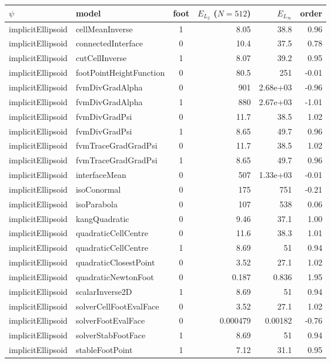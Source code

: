 \begin{tabular}{l l c r r r}
\hline
$\psi$ & model & foot & $E_{L_2}$ ($N{=}512$) & $E_{L_\infty}$ & order \\
\hline
implicitEllipsoid & cellMeanInverse & 1 & 8.05 & 38.8 & 0.96 \\
implicitEllipsoid & connectedInterface & 0 & 10.4 & 37.5 & 0.78 \\
implicitEllipsoid & cutCellInverse & 1 & 8.07 & 39.2 & 0.95 \\
implicitEllipsoid & footPointHeightFunction & 0 & 80.5 & 251 & -0.01 \\
implicitEllipsoid & fvmDivGradAlpha & 0 & 901 & 2.68e+03 & -0.96 \\
implicitEllipsoid & fvmDivGradAlpha & 1 & 880 & 2.67e+03 & -1.01 \\
implicitEllipsoid & fvmDivGradPsi & 0 & 11.7 & 38.5 & 1.02 \\
implicitEllipsoid & fvmDivGradPsi & 1 & 8.65 & 49.7 & 0.96 \\
implicitEllipsoid & fvmTraceGradGradPsi & 0 & 11.7 & 38.5 & 1.02 \\
implicitEllipsoid & fvmTraceGradGradPsi & 1 & 8.65 & 49.7 & 0.96 \\
implicitEllipsoid & interfaceMean & 0 & 507 & 1.33e+03 & -0.01 \\
implicitEllipsoid & isoConormal & 0 & 175 & 751 & -0.21 \\
implicitEllipsoid & isoParabola & 0 & 107 & 538 & 0.06 \\
implicitEllipsoid & kangQuadratic & 0 & 9.46 & 37.1 & 1.00 \\
implicitEllipsoid & quadraticCellCentre & 0 & 11.6 & 38.3 & 1.01 \\
implicitEllipsoid & quadraticCellCentre & 1 & 8.69 & 51 & 0.94 \\
implicitEllipsoid & quadraticClosestPoint & 0 & 3.52 & 27.1 & 1.02 \\
implicitEllipsoid & quadraticNewtonFoot & 0 & 0.187 & 0.836 & 1.95 \\
implicitEllipsoid & scalarInverse2D & 1 & 8.69 & 51 & 0.94 \\
implicitEllipsoid & solverCellFootEvalFace & 0 & 3.52 & 27.1 & 1.02 \\
implicitEllipsoid & solverFootEvalFace & 0 & 0.000479 & 0.00182 & -0.76 \\
implicitEllipsoid & solverStabFootFace & 1 & 8.69 & 51 & 0.94 \\
implicitEllipsoid & stableFootPoint & 1 & 7.12 & 31.1 & 0.95 \\

\end{tabular}
